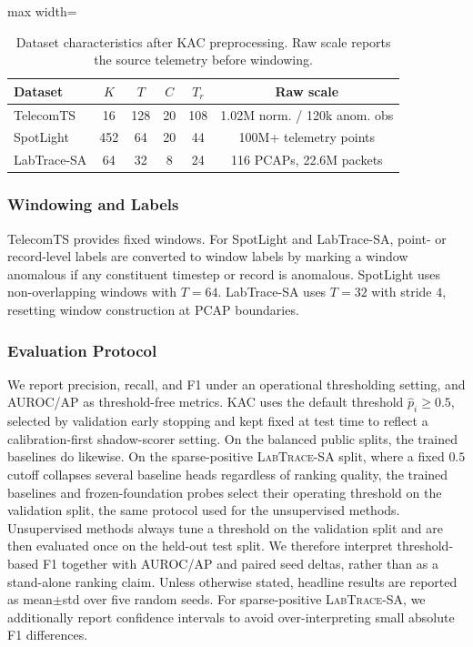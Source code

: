 \documentclass[conference]{IEEEtran}
\begin{document}
\begin{table}[t]
  \centering
  \caption{Dataset characteristics after KAC preprocessing. Raw scale reports the source telemetry before windowing.}
  \label{tab:dataset_stats}
  \small
  \setlength{\tabcolsep}{4pt}
  \begin{adjustbox}{max width=\columnwidth}
  \begin{tabular}{lccccc}
    \toprule
    Dataset & $K$ & $T$ & $C$ & $T_r$ & Raw scale \\
    \midrule
    TelecomTS  & 16  & 128 & 20 & 108 & 1.02M norm. / 120k anom. obs \\
    SpotLight  & 452 & 64  & 20 & 44  & 100M+ telemetry points \\
    LabTrace-SA & 64  & 32  & 8  & 24  & 116 PCAPs, 22.6M packets \\
    \bottomrule
  \end{tabular}
  \end{adjustbox}
\end{table}

\subsubsection{Windowing and Labels}
\label{sec:windowing}

TelecomTS provides fixed windows. For SpotLight and LabTrace-SA, point- or record-level labels are converted to window labels by marking a window anomalous if any constituent timestep or record is anomalous. SpotLight uses non-overlapping windows with $T=64$. LabTrace-SA uses $T=32$ with stride $4$, resetting window construction at PCAP boundaries.

\subsubsection{Evaluation Protocol}
\label{sec:protocol}

We report precision, recall, and F1 under an operational thresholding setting, and AUROC/AP as threshold-free metrics. KAC uses the default threshold $\hat{p}_i \geq 0.5$, selected by validation early stopping and kept fixed at test time to reflect a calibration-first shadow-scorer setting. On the balanced public splits, the trained baselines do likewise. On the sparse-positive \textsc{LabTrace-SA} split, where a fixed $0.5$ cutoff collapses several baseline heads regardless of ranking quality, the trained baselines and frozen-foundation probes select their operating threshold on the validation split, the same protocol used for the unsupervised methods. Unsupervised methods always tune a threshold on the validation split and are then evaluated once on the held-out test split. We therefore interpret threshold-based F1 together with AUROC/AP and paired seed deltas, rather than as a stand-alone ranking claim. Unless otherwise stated, headline results are reported as mean$\pm$std over five random seeds. For sparse-positive \textsc{LabTrace-SA}, we additionally report confidence intervals to avoid over-interpreting small absolute F1 differences.
\end{document}
